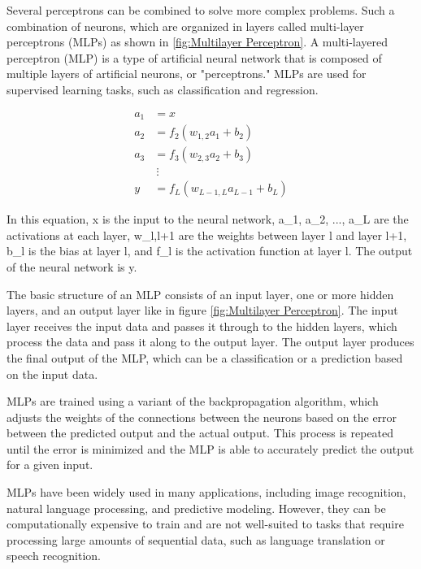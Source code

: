 \documentclass{report}
\begin{document}
	Several perceptrons can be combined to solve more complex problems. Such a
	combination of neurons, which are organized in layers called multi-layer perceptrons (MLPs) as shown in \ref{fig:Multilayer Perceptron}. A multi-layered perceptron (MLP) is a type of artificial neural network that is composed of multiple layers of artificial neurons, or "perceptrons." MLPs are used for supervised learning tasks, such as classification and regression.
	
	\begin{align*}
	a_1 &= x \\
	a_2 &= f_2(w_{1,2} a_1 + b_2) \\
	a_3 &= f_3(w_{2,3} a_2 + b_3) \\
	& \ \vdots \\
	y &= f_L(w_{L-1,L} a_{L-1} + b_L)
	\end{align*}
	
	In this equation, x is the input to the neural network, a\_1, a\_2, ..., a\_L are the activations at each layer, w\_{l,l+1} are the weights between layer l and layer l+1, b\_l is the bias at layer l, and f\_l is the activation function at layer l. The output of the neural network is y.
	
	The basic structure of an MLP consists of an input layer, one or more hidden layers, and an output layer like in figure \ref{fig:Multilayer Perceptron}. The input layer receives the input data and passes it through to the hidden layers, which process the data and pass it along to the output layer. The output layer produces the final output of the MLP, which can be a classification or a prediction based on the input data.
	
	MLPs are trained using a variant of the backpropagation algorithm, which adjusts the weights of the connections between the neurons based on the error between the predicted output and the actual output. This process is repeated until the error is minimized and the MLP is able to accurately predict the output for a given input.
	
	MLPs have been widely used in many applications, including image recognition, natural language processing, and predictive modeling. However, they can be computationally expensive to train and are not well-suited to tasks that require processing large amounts of sequential data, such as language translation or speech recognition.
	
\end{document}
